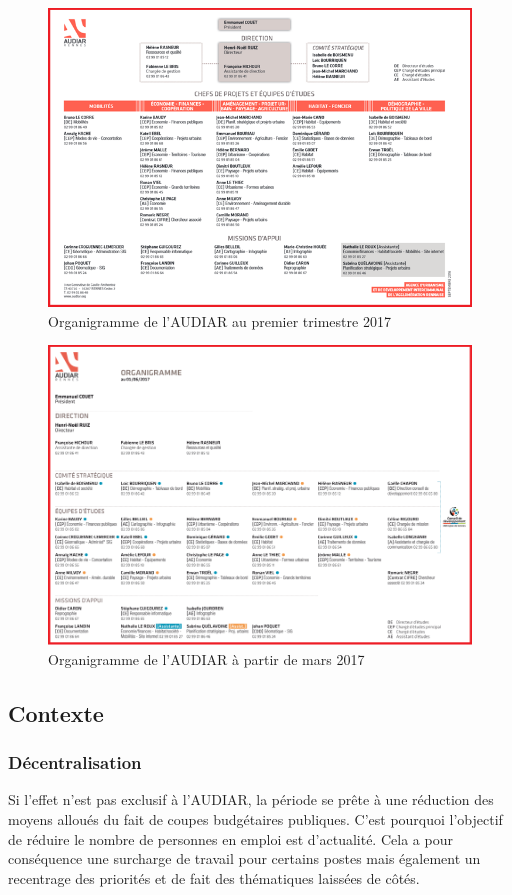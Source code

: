 \documentclass{bredele}
\begin{document}
\begin{figure}[b] \centering
\includegraphics[width=12cm]{organigramme1.png}
\caption{Organigramme de l'AUDIAR au premier trimestre 2017}
\begin{flushright}
\end{flushright}
\end{figure}
\begin{figure} \centering
\includegraphics[width=12cm]{organigramme2.png}
\caption{Organigramme de l'AUDIAR à partir de mars 2017}
\begin{flushright}
\end{flushright}
\end{figure}
\subsection{Contexte}
\subsubsection{Décentralisation}
Si l'effet n’est pas exclusif à l’AUDIAR, la période se prête à une réduction des moyens alloués du fait de coupes budgétaires publiques. C’est pourquoi l’objectif de réduire le nombre de personnes en emploi est d’actualité. Cela a pour conséquence une surcharge de travail pour certains postes mais également un recentrage des priorités et de fait des thématiques laissées de côtés.
\end{document}
